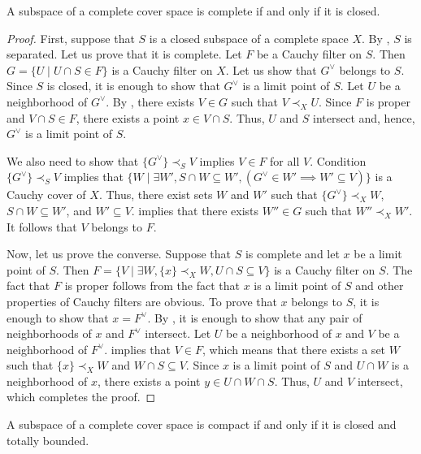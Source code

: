 \documentclass[reqno]{amsart}
\theoremstyle{definition}
\theoremstyle{remark}
\numberwithin{figure}{section}
\newcommand{\rb}{\prec}
\begin{document}
\begin{prop}
A subspace of a complete cover space is complete if and only if it is closed.
\end{prop}
\begin{proof}
First, suppose that $S$ is a closed subspace of a complete space $X$.
By , $S$ is separated.
Let us prove that it is complete.
Let $F$ be a Cauchy filter on $S$.
Then $G = \{ U \mid U \cap S \in F \}$ is a Cauchy filter on $X$.
Let us show that $G^\vee$ belongs to $S$.
Since $S$ is closed, it is enough to show that $G^\vee$ is a limit point of $S$.
Let $U$ be a neighborhood of $G^\vee$.
By , there exists $V \in G$ such that $V \rb_X U$.
Since $F$ is proper and $V \cap S \in F$, there exists a point $x \in V \cap S$.
Thus, $U$ and $S$ intersect and, hence, $G^\vee$ is a limit point of $S$.

We also need to show that $\{ G^\vee \} \rb_S V$ implies $V \in F$ for all $V$.
Condition $\{ G^\vee \} \rb_S V$ implies that $\{ W \mid \exists W', S \cap W \subseteq W', (G^\vee \in W' \implies W' \subseteq V) \}$ is a Cauchy cover of $X$.
Thus, there exist sets $W$ and $W'$ such that $\{ G^\vee \} \rb_X W$, $S \cap W \subseteq W'$, and $W' \subseteq V$.
 implies that there exists $W'' \in G$ such that $W'' \rb_X W'$.
It follows that $V$ belongs to $F$.

Now, let us prove the converse.
Suppose that $S$ is complete and let $x$ be a limit point of $S$.
Then $F = \{ V \mid \exists W, \{ x \} \rb_X W, U \cap S \subseteq V \}$ is a Cauchy filter on $S$.
The fact that $F$ is proper follows from the fact that $x$ is a limit point of $S$ and other properties of Cauchy filters are obvious.
To prove that $x$ belongs to $S$, it is enough to show that $x = F^\vee$.
By , it is enough to show that any pair of neighborhoods of $x$ and $F^\vee$ intersect.
Let $U$ be a neighborhood of $x$ and $V$ be a neighborhood of $F^\vee$.
 implies that $V \in F$, which means that there exists a set $W$ such that $\{ x \} \rb_X W$ and $W \cap S \subseteq V$.
Since $x$ is a limit point of $S$ and $U \cap W$ is a neighborhood of $x$, there exists a point $y \in U \cap W \cap S$.
Thus, $U$ and $V$ intersect, which completes the proof.
\end{proof}

\begin{cor}
A subspace of a complete cover space is compact if and only if it is closed and totally bounded.
\end{cor}
\end{document}
